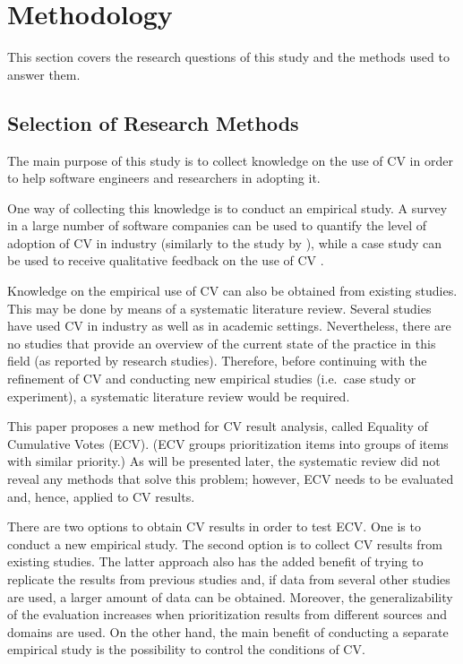 \section{Methodology\label{methodology}}

This section covers the research questions of this study and the methods used to answer them.

\subsection{Selection of Research Methods}

The main purpose of this study is to collect knowledge on the use of CV in order to help software engineers and researchers in adopting it.%

One way of collecting this knowledge is to conduct an empirical study. A
survey in a large number of software companies can be used to quantify the
level of adoption of CV in industry (similarly to the study by \cite{Zahedi1986}), 
while a case study can be used to receive qualitative feedback on the use of CV \cite{Runeson2008}.

Knowledge on the empirical use of CV can also be obtained from existing
studies. This may be done by means of a systematic literature review. Several
studies have used CV in industry as well as in academic settings.
Nevertheless, there are no studies that provide an overview of the current state
of the practice in this field (as reported by research studies). 
Therefore, before continuing with the refinement of CV and conducting new 
empirical studies (i.e.\ case study or experiment), a systematic literature review would 
be required.

This paper proposes a new method for CV result analysis, called Equality of Cumulative Votes (ECV).
(ECV groups prioritization items into groups of items with similar priority.)
As will be presented later, the systematic review did not reveal any methods that solve this problem; however, ECV needs to be evaluated and, hence, applied to CV results.

There are two options to obtain CV results in order to test ECV. One is to conduct a new empirical study. The second option is to collect CV results from existing studies. The latter approach also has the added benefit of trying to replicate the results from previous studies and, if data from several other studies are used, a larger amount of data can be obtained. Moreover, the generalizability of the evaluation increases when prioritization results from different sources and domains are used.
On the other hand, the main benefit of conducting a separate empirical study is the possibility to control the conditions of CV.

